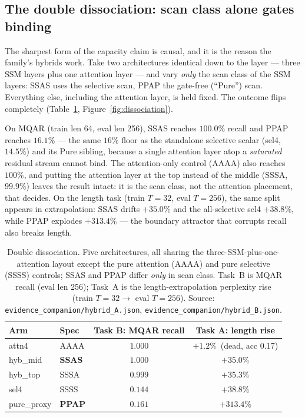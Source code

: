 \documentclass[11pt]{article}
\theoremstyle{definition}
\newcommand{\code}[1]{\texttt{#1}}
\begin{document}
\subsection{The double dissociation: scan class alone gates binding}
\label{sec:dissociation}
The sharpest form of the capacity claim is causal, and it is the reason the family's hybrids
work. Take two architectures identical down to the layer --- three SSM layers plus one attention
layer --- and vary \emph{only} the scan class of the SSM layers: SSAS uses the selective scan,
PPAP the gate-free (``Pure'') scan. Everything else, including the attention layer, is held fixed.
The outcome flips completely (Table~\ref{tab:dissociation}, Figure~\ref{fig:dissociation}).

On MQAR (train len 64, eval len 256), SSAS reaches $100.0\%$ recall and PPAP reaches $16.1\%$ ---
the same $16\%$ floor as the standalone selective scalar (sel4, $14.5\%$) and its Pure sibling,
because a single attention layer atop a \emph{saturated} residual stream cannot bind. The
attention-only control (AAAA) also reaches $100\%$, and putting the attention layer at the top
instead of the middle (SSSA, $99.9\%$) leaves the result intact: it is the scan class, not the
attention placement, that decides. On the length task (train $T{=}32$, eval $T{=}256$), the same
split appears in extrapolation: SSAS drifts $+35.0\%$ and the all-selective sel4 $+38.8\%$, while
PPAP explodes $+313.4\%$ --- the boundary attractor that corrupts recall also breaks length.

\begin{table}[t]
\centering
\caption{Double dissociation. Five architectures, all sharing the three-SSM-plus-one-attention
layout except the pure attention (AAAA) and pure selective (SSSS) controls; SSAS and PPAP differ
\emph{only} in scan class. Task~B is MQAR recall (eval len 256); Task~A is the length-extrapolation
perplexity rise (train $T{=}32\!\to\!$ eval $T{=}256$). Source:
\code{evidence\_companion/hybrid\_A.json}, \code{evidence\_companion/hybrid\_B.json}.}
\label{tab:dissociation}
\small
\begin{tabular}{@{}llcc@{}}
\toprule
Arm & Spec & Task B: MQAR recall & Task A: length rise \\
\midrule
attn4      & AAAA & $1.000$ & $+1.2\%$\ (dead, acc 0.17)\\
hyb\_mid   & \textbf{SSAS} & $\mathbf{1.000}$ & $+35.0\%$\\
hyb\_top   & SSSA & $0.999$ & $+35.3\%$\\
sel4       & SSSS & $0.144$ & $+38.8\%$\\
pure\_proxy & \textbf{PPAP} & $\mathbf{0.161}$ & $+313.4\%$\\
\bottomrule
\end{tabular}
\end{table}
\end{document}
